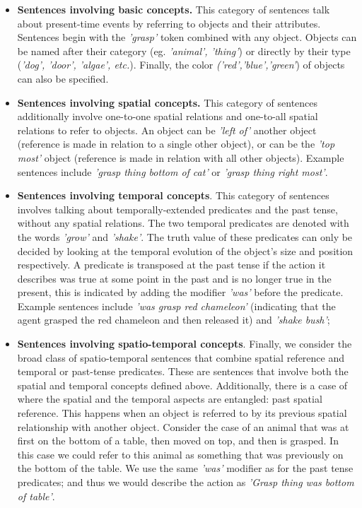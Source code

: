\begin{itemize}[noitemsep]
    \item \textbf{Sentences involving basic concepts.} This category of sentences talk about present-time events by referring to objects and their attributes. Sentences begin with the \textit{'grasp'} token combined with any object. Objects can be named after their category (eg.  \textit{'animal', 'thing'}) or directly by their type (\textit{'dog', 'door', 'algae', etc.}). Finally, the color \textit{('red','blue','green'}) of objects can also be specified. 
    \item \textbf{Sentences involving spatial concepts.} This category of sentences additionally involve one-to-one spatial relations and one-to-all spatial relations to refer to objects. An object can be \textit{'left of'} another object (reference is made in relation to a single other object), or can be the \textit{'top most'} object (reference is made in relation with all other objects). Example sentences include \textit{'grasp thing bottom of cat'} or \textit{'grasp thing right most'}.
    \item \textbf{Sentences involving temporal concepts}. This category of sentences involves talking about temporally-extended predicates and the past tense, without any spatial relations. The two temporal predicates are denoted with the words \textit{'grow'} and \textit{'shake'}. The truth value of these predicates can only be decided by looking at the temporal evolution of the object's size and position respectively. A predicate is transposed at the past tense if the action it describes was true at some point in the past and is no longer true in the present, this is indicated by adding the modifier \textit{'was'} before the predicate. Example sentences include \textit{'was grasp red chameleon'} (indicating that the agent grasped the red chameleon and then released it) and \textit{'shake bush'};
    \item \textbf{Sentences involving spatio-temporal concepts}. Finally, we consider the broad class of spatio-temporal sentences that combine spatial reference and temporal or past-tense predicates. These are sentences that involve both the spatial and temporal concepts defined above. Additionally, there is a case of where the spatial and the temporal aspects are entangled: past spatial reference. This happens when an object is referred to by its previous spatial relationship with another object. Consider the case of an animal that was at first on the bottom of a table, then moved on top, and then is grasped. In this case we could refer to this animal as something that was previously on the bottom of the table. We use the same \textit{'was'} modifier as for the past tense predicates; and thus we would describe the action as \textit{'Grasp thing was bottom of table'}.
\end{itemize}

